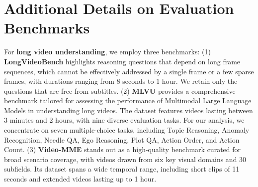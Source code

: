 \section{Additional Details on Evaluation Benchmarks} \label{appendix:benchmarks}

For \textbf{long video understanding}, we employ three benchmarks: (1) \textbf{LongVideoBench} highlights reasoning questions that depend on long frame sequences, which cannot be effectively addressed by a single frame or a few sparse frames, with durations ranging from 8 seconds to 1 hour. We retain only the questions that are free from subtitles.
(2) \textbf{MLVU} provides a comprehensive benchmark tailored for assessing the performance of Multimodal Large Language Models in understanding long videos. The dataset features videos lasting between 3 minutes and 2 hours, with nine diverse evaluation tasks. For our analysis, we concentrate on seven multiple-choice tasks, including Topic Reasoning, Anomaly Recognition, Needle QA, Ego Reasoning, Plot QA, Action Order, and Action Count.
(3) \textbf{Video-MME} stands out as a high-quality benchmark curated for broad scenario coverage, with videos drawn from six key visual domains and 30 subfields. Its dataset spans a wide temporal range, including short clips of 11 seconds and extended videos lasting up to 1 hour.

